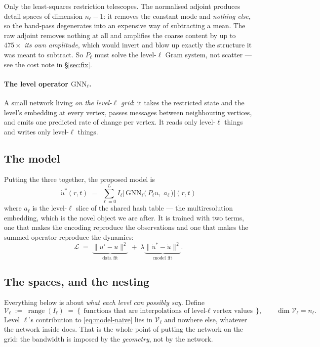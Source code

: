 \documentclass[11pt,a4paper]{article}
\newcommand{\Vs}{\mathcal{V}}
\newcommand{\ran}{\operatorname{range}}
\begin{document}
\noindent
Only the least-squares restriction telescopes. The normalised adjoint produces detail spaces
of dimension $n_\ell - 1$: it removes the constant mode and \emph{nothing else}, so the
band-pass degenerates into an expensive way of subtracting a mean. The raw adjoint removes
nothing at all and amplifies the coarse content by up to $475\times$ \emph{its own
amplitude}, which would invert and blow up exactly the structure it was meant to subtract.
So $P_\ell$ must solve the level-$\ell$ Gram system, not scatter --- see the cost note in
\S\ref{sec:fix}.

\paragraph{The level operator $\mathrm{GNN}_\ell$.} A small network living \emph{on the
level-$\ell$ grid}: it takes the restricted state and the level's embedding at every
vertex, passes messages between neighbouring vertices, and emits one predicted rate of
change per vertex. It reads only level-$\ell$ things and writes only level-$\ell$ things.

\subsection{The model}

Putting the three together, the proposed model is
\begin{equation}
\boxed{\;
\dot u^{*}(r,t) \;=\; \sum_{\ell=0}^{L} I_\ell\Big[\,
   \mathrm{GNN}_\ell\big(\, P_\ell u,\; a_\ell \,\big)
\Big](r,t)
\;}
\label{eq:model-naive}
\end{equation}
where $a_\ell$ is the level-$\ell$ slice of the shared hash table --- the multiresolution
embedding, which is the novel object we are after. It is trained with two terms, one that
makes the encoding reproduce the observations and one that makes the summed operator
reproduce the dynamics:
\begin{equation}
\mathcal{L} \;=\;
\underbrace{\big\| u' - u \big\|^2}_{\text{data fit}}
\;+\;
\lambda \underbrace{\big\| \dot u^{*} - \dot u \big\|^2}_{\text{model fit}} .
\label{eq:loss}
\end{equation}

\subsection{The spaces, and the nesting}

Everything below is about \emph{what each level can possibly say}. Define
\begin{equation}
\Vs_\ell \;:=\; \ran(I_\ell)
\;=\;\{\, \text{functions that are interpolations of level-$\ell$ vertex values} \,\},
\qquad \dim \Vs_\ell = n_\ell .
\label{eq:Vspace}
\end{equation}
Level $\ell$'s contribution to \eqref{eq:model-naive} lies in $\Vs_\ell$ and nowhere else,
whatever the network inside does. That is the whole point of putting the network on the
grid: the bandwidth is imposed by the \emph{geometry}, not by the network.
\end{document}
